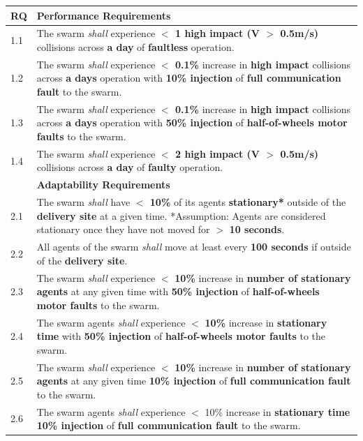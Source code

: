 \documentclass[runningheads]{llncs}
\begin{document}
\begin{table}[!t]
	\centering
	\begin{tabular}{p{5mm} p{116mm} }
		RQ & \textbf{Performance Requirements}\\
		\hline
		1.1 & The swarm \emph{shall} experience \textbf{$<$ 1 high impact (V $>$ 0.5m/s)} collisions across \textbf{a day} of \textbf{faultless} operation. \\ 
		\hline
		1.2 & The swarm \emph{shall} experience \textbf{$<$ 0.1\%} increase in \textbf{high impact} collisions across \textbf{a days} operation with \textbf{10\% injection} of \textbf{full communication fault} to the swarm.\\ 
		\hline
		1.3 & The swarm \emph{shall} experience \textbf{$<$ 0.1\%} increase in \textbf{high impact} collisions across \textbf{a days} operation with \textbf{50\% injection} of \textbf{half-of-wheels motor faults} to the swarm.	\\	
		\hline
		1.4 & The swarm \emph{shall} experience \textbf{$<$ 2 high impact (V $>$ 0.5m/s)} collisions across \textbf{a day} of \textbf{faulty} operation.  \\		[1ex] 		
		\hline
		& \textbf{Adaptability Requirements}\\
		\hline
		2.1 & The swarm \emph{shall} have \textbf{$<$ 10\%} of its agents \textbf{stationary*} outside of the \textbf{delivery site} at a given time.
		*Assumption: Agents are considered stationary once they have not moved for $>$ \textbf{10 seconds}.
		\\ 
		\hline
		2.2 & All agents of the swarm \emph{shall} move at least every \textbf{100 seconds} if outside of the \textbf{delivery site}. \\ 
		\hline
		2.3 & The swarm \emph{shall} experience $<$ \textbf{10\%} increase in \textbf{number of stationary agents} at any given time with \textbf{50\% injection} of \textbf{half-of-wheels motor faults} to the swarm. \\
		\hline
		2.4 & The swarm agents \emph{shall} experience $<$ \textbf{10\%} increase in \textbf{stationary time} with \textbf{50\% injection} of \textbf{half-of-wheels motor faults} to the swarm.\\ 
		\hline
		2.5 & The swarm \emph{shall} experience $<$ \textbf{10\%} increase in \textbf{number of stationary agents} at any given time \textbf{10\% injection} of \textbf{full communication fault} to the swarm.\\
		\hline
		2.6 & The swarm agents \emph{shall} experience $<$ 10\% increase in \textbf{stationary time 10\% injection} of \textbf{full communication fault} to the swarm. \\	

\end{tabular}
\end{table}
\end{document}
